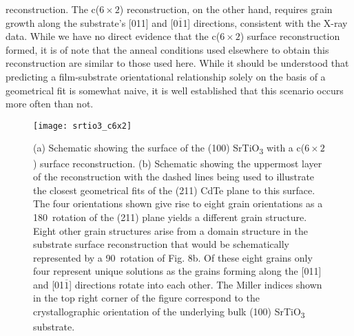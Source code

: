 reconstruction. The c($6\times2$) reconstruction, on the other hand,
requires grain growth along the substrate’s [011] and [0$\overline{1}$1]
directions, consistent with the X-ray data. While we have no direct
evidence that the c($6\times2$) surface reconstruction formed, it is of
note that the anneal conditions used elsewhere\cite{Jiang1996} to obtain this
reconstruction are similar to those used here. While it should be
understood that predicting a film-substrate orientational relationship solely on the basis of a geometrical fit is somewhat naive, it is well established that this scenario occurs more often than not.
\begin{figure}
    \centering
    \texttt{[image: srtio3\_c6x2]}
    \caption[CdTe on c(6$\times$2) SrTiO\textsubscript{3} surface]{\label{fig:srtio3_c6x2}(a) Schematic showing the surface of the (100) SrTiO\textsubscript{3} with a c($6\times2$) surface reconstruction. (b) Schematic showing the uppermost layer of the reconstruction with the
        dashed lines being used to illustrate the closest geometrical fits of the (211) CdTe plane to this surface. The four orientations shown give rise to eight grain orientations as a
        180\degree~rotation of the (211) plane yields a different grain structure. Eight other grain structures arise from a domain structure in the substrate surface reconstruction that
        would be schematically represented by a 90\degree~rotation of Fig. 8b. Of these eight grains only four represent unique solutions as the grains forming along the [011] and [01$\overline{1}$]
        directions rotate into each other. The Miller indices shown in the top right corner of the figure correspond to the crystallographic orientation of the underlying bulk (100)
        SrTiO\textsubscript{3} substrate.}
\end{figure}

